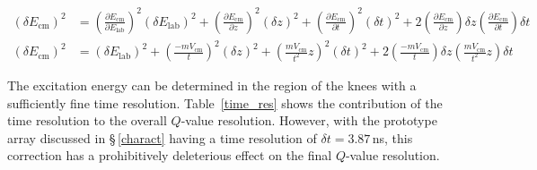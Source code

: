 \begin{equation}
\begin{split}
\left(\delta E_\mathrm{cm}\right)^2&=\left(\frac{\partial E_\mathrm{cm}}{\partial E_\mathrm{lab}}\right)^2\left(\delta E_\mathrm{lab}\right)^2+\left(\frac{\partial E_\mathrm{cm}}{\partial z}\right)^2\left(\delta z\right)^2+\left(\frac{\partial E_\mathrm{cm}}{\partial t}\right)^2\left(\delta t\right)^2+2\left(\frac{\partial E_\mathrm{cm}}{\partial z}\right) \delta z \left(\frac{\partial E_\mathrm{cm}}{\partial t}\right)\delta t\\
\left(\delta E_\mathrm{cm}\right)^2&=\left(\delta E_\mathrm{lab}\right)^2+\left(\frac{-m V_\mathrm{cm}}{t}\right)^2\left(\delta z\right)^2+\left(\frac{m V_\mathrm{cm}}{t^2}z\right)^2\left(\delta t\right)^2+2\left(\frac{-m V_\mathrm{cm}}{t}\right) \delta z \left(\frac{m V_\mathrm{cm}}{t^2}z\right)\delta t
\end{split}
\label{eq:delta_z3}
\end{equation}

The excitation energy can be determined in the region of the knees with a sufficiently fine time resolution. Table~\ref{time_res} shows the contribution of the time resolution to the overall $Q$-value resolution.  However, with the prototype array discussed in \S\,\ref{charact} having a time resolution of $\delta t=3.87$\,ns, this correction has a prohibitively deleterious effect on the final $Q$-value resolution. 

